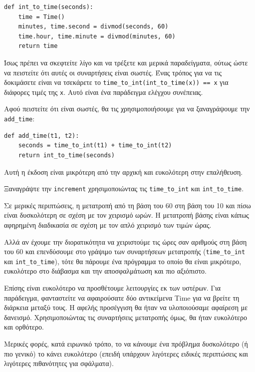 \documentclass[10pt]{book}
\begin{document}
\begin{verbatim}
def int_to_time(seconds):
    time = Time()
    minutes, time.second = divmod(seconds, 60)
    time.hour, time.minute = divmod(minutes, 60)
    return time
\end{verbatim}
%
Ίσως πρέπει να σκεφτείτε λίγο και να τρέξετε και μερικά παραδείγματα, ούτως ώστε να πειστείτε ότι
αυτές οι συναρτήσεις είναι σωστές. Ένας τρόπος για να τις δοκιμάσετε είναι να τσεκάρετε το
\verb"time_to_int(int_to_time(x)) == x"  για διάφορες τιμές της {\tt x}. Αυτό είναι ένα παράδειγμα
ελέγχου συνέπειας.

Αφού πειστείτε ότι είναι σωστές, θα τις χρησιμοποιήσουμε για να ξαναγράψουμε την
\verb"add_time":

\begin{verbatim}
def add_time(t1, t2):
    seconds = time_to_int(t1) + time_to_int(t2)
    return int_to_time(seconds)
\end{verbatim}
%
Αυτή η έκδοση είναι μικρότερη από την αρχική και ευκολότερη στην επαλήθευση.
\\

\begin{exercise}

Ξαναγράψτε την {\tt increment} χρησιμοποιώντας τις \verb"time_to_int" και \verb"int_to_time".
\end{exercise}

Σε μερικές περιπτώσεις, η μετατροπή από τη βάση του 60 στη βάση του 10 και πίσω είναι δυσκολότερη σε
σχέση με τον χειρισμό ωρών. Η μετατροπή βάσης είναι κάπως αφηρημένη διαδικασία σε σχέση με τον απλό
χειρισμό των τιμών ώρας.

Αλλά αν έχουμε την διορατικότητα να χειριστούμε τις ώρες σαν αριθμούς στη βάση του 60 και επενδύσουμε στο
γράψιμο των συναρτήσεων μετατροπής (\verb"time_to_int" και \verb"int_to_time"), τότε θα πάρουμε ένα πρόγραμμα
το οποίο θα είναι μικρότερο, ευκολότερο στο διάβασμα και την αποσφαλμάτωση και πιο αξιόπιστο.

Επίσης είναι ευκολότερο να προσθέτουμε λειτουργίες εκ των υστέρων. Για παράδειγμα, φανταστείτε να
αφαιρούσατε δύο αντικείμενα Time για να βρείτε τη διάρκεια μεταξύ τους. Η αφελής προσέγγιση θα ήταν να
υλοποιούσαμε αφαίρεση με δανεισμό. Χρησιμοποιώντας τις συναρτήσεις μετατροπής όμως, θα ήταν ευκολότερο
και ορθότερο.

Μερικές φορές, κατά ειρωνικό τρόπο, το να κάνουμε ένα πρόβλημα δυσκολότερο (ή πιο γενικό) το κάνει ευκολότερο
(επειδή υπάρχουν λιγότερες ειδικές περιπτώσεις και λιγότερες πιθανότητες για σφάλματα).
\end{document}
